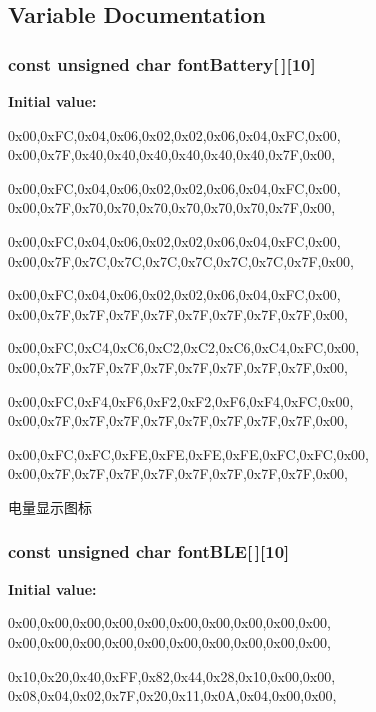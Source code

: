 \subsection{\-Variable \-Documentation}
\hypertarget{group___w_i_d_g_e_t_ga9cac21b10aac988fd92e2cd2c78a4319}{
\subsubsection[{font\-Battery}]{\setlength{\rightskip}{0pt plus 5cm}const unsigned char {\bf font\-Battery}\mbox{[}$\,$\mbox{]}\mbox{[}10\mbox{]}}}\label{group___w_i_d_g_e_t_ga9cac21b10aac988fd92e2cd2c78a4319}
{\bfseries \-Initial value\-:}
\begin{DoxyCode}
 
{

{0x00,0xFC,0x04,0x06,0x02,0x02,0x06,0x04,0xFC,0x00},
{0x00,0x7F,0x40,0x40,0x40,0x40,0x40,0x40,0x7F,0x00},

{0x00,0xFC,0x04,0x06,0x02,0x02,0x06,0x04,0xFC,0x00},
{0x00,0x7F,0x70,0x70,0x70,0x70,0x70,0x70,0x7F,0x00},

{0x00,0xFC,0x04,0x06,0x02,0x02,0x06,0x04,0xFC,0x00},
{0x00,0x7F,0x7C,0x7C,0x7C,0x7C,0x7C,0x7C,0x7F,0x00},

{0x00,0xFC,0x04,0x06,0x02,0x02,0x06,0x04,0xFC,0x00},
{0x00,0x7F,0x7F,0x7F,0x7F,0x7F,0x7F,0x7F,0x7F,0x00},

{0x00,0xFC,0xC4,0xC6,0xC2,0xC2,0xC6,0xC4,0xFC,0x00},
{0x00,0x7F,0x7F,0x7F,0x7F,0x7F,0x7F,0x7F,0x7F,0x00},

{0x00,0xFC,0xF4,0xF6,0xF2,0xF2,0xF6,0xF4,0xFC,0x00},
{0x00,0x7F,0x7F,0x7F,0x7F,0x7F,0x7F,0x7F,0x7F,0x00},

{0x00,0xFC,0xFC,0xFE,0xFE,0xFE,0xFE,0xFC,0xFC,0x00},
{0x00,0x7F,0x7F,0x7F,0x7F,0x7F,0x7F,0x7F,0x7F,0x00},

}
\end{DoxyCode}


电量显示图标 

\hypertarget{group___w_i_d_g_e_t_gae789ac73b9f8bf563ff477571af3e532}{
\subsubsection[{font\-B\-L\-E}]{\setlength{\rightskip}{0pt plus 5cm}const unsigned char {\bf font\-B\-L\-E}\mbox{[}$\,$\mbox{]}\mbox{[}10\mbox{]}}}\label{group___w_i_d_g_e_t_gae789ac73b9f8bf563ff477571af3e532}
{\bfseries \-Initial value\-:}
\begin{DoxyCode}
 
{

{0x00,0x00,0x00,0x00,0x00,0x00,0x00,0x00,0x00,0x00},
{0x00,0x00,0x00,0x00,0x00,0x00,0x00,0x00,0x00,0x00},

{0x10,0x20,0x40,0xFF,0x82,0x44,0x28,0x10,0x00,0x00},
{0x08,0x04,0x02,0x7F,0x20,0x11,0x0A,0x04,0x00,0x00},
}
\end{DoxyCode}


